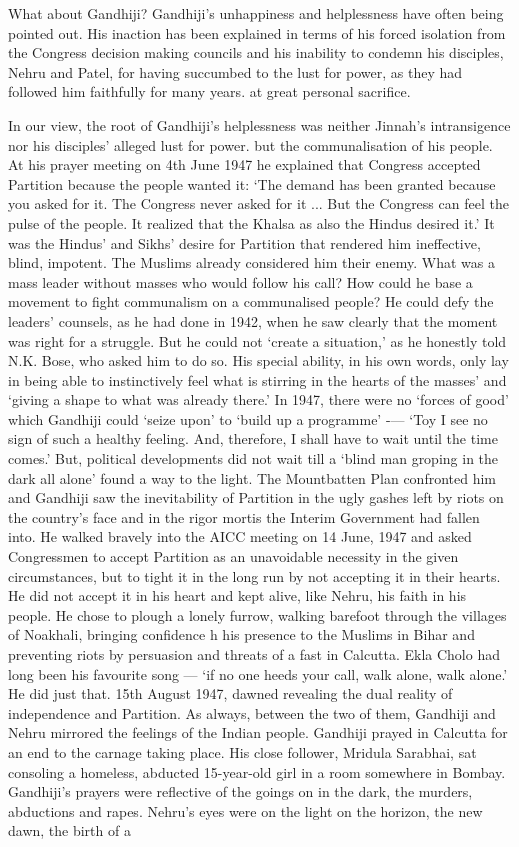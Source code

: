 What about Gandhiji? Gandhiji's unhappiness and helplessness have often being pointed out. His inaction has been explained in terms of his forced isolation from the Congress decision making councils and his inability to condemn his disciples, Nehru and Patel, for having succumbed to the lust for power, as they had followed him faithfully for many years. at great personal sacrifice. 

In our view, the root of Gandhiji's helplessness was neither Jinnah's intransigence nor his disciples' alleged lust for power. but the communalisation of his people. At his prayer meeting on 4th June 1947 he explained that Congress accepted Partition because the people wanted it: `The demand has been granted because you asked for it. The Congress never asked for it ... But the Congress can feel the pulse of the people. It realized that the Khalsa as also the Hindus desired it.' It was the Hindus' and Sikhs' desire for Partition that rendered him ineffective, blind, impotent. The Muslims already considered him their enemy. What was a mass leader without masses who would follow his call? How could he base a movement to fight communalism on a communalised people? He could defy the leaders' counsels, as he had done in 1942, when he saw clearly that the moment was right for a struggle. But he could not `create a situation,' as he honestly told N.K. Bose, who asked him to do so. His special ability, in his own words, only lay in being able to instinctively feel what is stirring in the hearts of the masses' and `giving a shape to what was already there.' In 1947, there were no `forces of good' which Gandhiji could `seize upon' to `build up a programme' -— `Toy I see no sign of such a healthy feeling. And, therefore, I shall have to wait until the time comes.' But, political developments did not wait till a `blind man groping in the dark all alone' found a way to the light. The Mountbatten Plan confronted him and Gandhiji saw the inevitability of Partition in the ugly gashes left by riots on the country's face and in the rigor mortis the Interim Government had fallen into. He walked bravely into the AICC meeting on 14 June, 1947 and asked Congressmen to accept Partition as an unavoidable necessity in the given circumstances, but to tight it in the long run by not accepting it in their hearts. He did not accept it in his heart and kept alive, like Nehru, his faith in his people. He chose to plough a lonely furrow, walking barefoot through the villages of Noakhali, bringing confidence h his presence to the Muslims in Bihar and preventing riots by persuasion and threats of a fast in Calcutta. Ekla Cholo had long been his favourite song — `if no one heeds your call, walk alone, walk alone.' He did just that. 15th August 1947, dawned revealing the dual reality of independence and Partition. As always, between the two of them, Gandhiji and Nehru mirrored the feelings of the Indian people. Gandhiji prayed in Calcutta for an end to the carnage taking place. His close follower, Mridula Sarabhai, sat consoling a homeless, abducted 15-year-old girl in a room somewhere in Bombay. Gandhiji's prayers were reflective of the goings on in the dark, the murders, abductions and rapes. Nehru's eyes were on the light on the horizon, the new dawn, the birth of a 